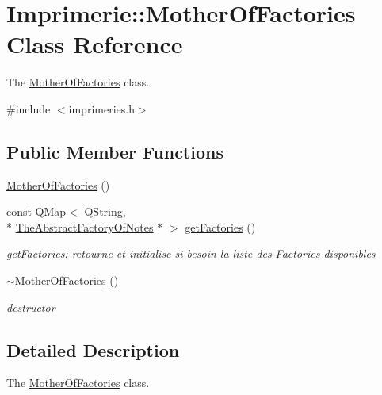 \hypertarget{class_imprimerie_1_1_mother_of_factories}{\section{Imprimerie\-:\-:Mother\-Of\-Factories Class Reference}
\label{class_imprimerie_1_1_mother_of_factories}
}


The \hyperlink{class_imprimerie_1_1_mother_of_factories}{Mother\-Of\-Factories} class.  




{\ttfamily \#include $<$imprimeries.\-h$>$}

\subsection*{Public Member Functions}
\begin{DoxyCompactItemize}
\item 
\hyperlink{class_imprimerie_1_1_mother_of_factories_a07be7e1d9f272b24273cb86dd6ab09d7}{Mother\-Of\-Factories} ()
\item 
const Q\-Map$<$ Q\-String, \\*
\hyperlink{class_imprimerie_1_1_the_abstract_factory_of_notes}{The\-Abstract\-Factory\-Of\-Notes} $\ast$ $>$ \hyperlink{class_imprimerie_1_1_mother_of_factories_a8efccb3a38b9dd82c0713b0424fc190f}{get\-Factories} ()
\begin{DoxyCompactList}\small\item\em get\-Factories\-: retourne et initialise si besoin la liste des Factories disponibles \end{DoxyCompactList}\item 
\hyperlink{class_imprimerie_1_1_mother_of_factories_a4a4387b85fac4224db7dd040074b7f21}{$\sim$\-Mother\-Of\-Factories} ()
\begin{DoxyCompactList}\small\item\em destructor \end{DoxyCompactList}\end{DoxyCompactItemize}


\subsection{Detailed Description}
The \hyperlink{class_imprimerie_1_1_mother_of_factories}{Mother\-Of\-Factories} class. 

